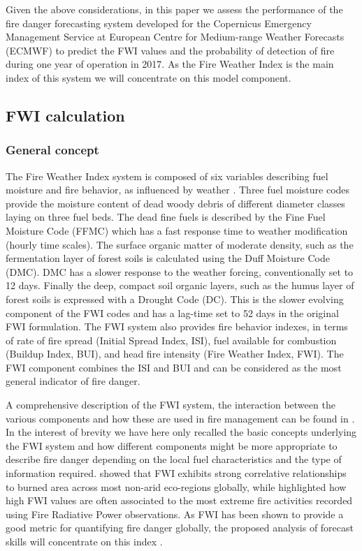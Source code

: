 \documentclass[, manuscript]{copernicus}
\begin{document}
Given the above considerations, in this paper we assess the performance
of the fire danger forecasting system developed for the Copernicus
Emergency Management Service at European Centre for Medium-range Weather
Forecasts (ECMWF) to predict the FWI values and the probability of
detection of fire during one year of operation in 2017. As the Fire
Weather Index is the main index of this system we will concentrate on
this model component.

\subsection{FWI calculation}
\subsubsection{General concept}

The Fire Weather Index system is composed of six variables describing
fuel moisture and fire behavior, as influenced by weather
\citep{vanwagner:87}. Three fuel moisture codes provide the moisture
content of dead woody debris of different diameter classes laying on
three fuel beds. The dead fine fuels is described by the Fine Fuel
Moisture Code (FFMC) which has a fast response time to weather
modification (hourly time scales). The surface organic matter of
moderate density, such as the fermentation layer of forest soils
\citep{hood:10} is calculated using the Duff Moisture Code (DMC). DMC
has a slower response to the weather forcing, conventionally set to 12
days. Finally the deep, compact soil organic layers, such as the humus
layer of forest soils \citet{hood:10} is expressed with a Drought Code
(DC). This is the slower evolving component of the FWI codes and has a
lag-time set to 52 days in the original FWI formulation. The FWI system
also provides fire behavior indexes, in terms of rate of fire spread
(Initial Spread Index, ISI), fuel available for combustion (Buildup
Index, BUI), and head fire intensity (Fire Weather Index, FWI). The FWI
component combines the ISI and BUI and can be considered as the most
general indicator of fire danger.

A comprehensive description of the FWI system, the interaction between
the various components and how these are used in fire management can be
found in \citep{vanwagner:87,wotton:09}. In the interest of brevity we
have here only recalled the basic concepts underlying the FWI system and
how different components might be more appropriate to describe fire
danger depending on the local fuel characteristics and the type of
information required. \cite{abatzoglou:18} showed that FWI exhibits
strong correlative relationships to burned area across most non-arid
eco-regions globally, while \citet{bowman:17} highlighted how high FWI
values are often associated to the most extreme fire activities recorded
using Fire Radiative Power observations. As FWI has been shown to
provide a good metric for quantifying fire danger globally, the proposed
analysis of forecast skills will concentrate on this index
\citep{digiuseppe:16,degroot:07}.
\end{document}
